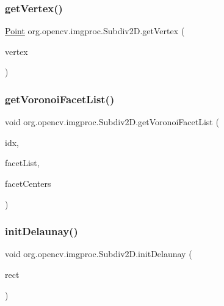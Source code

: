 \subsubsection{\texorpdfstring{get\+Vertex()}{getVertex()}\hspace{0.1cm}{\footnotesize\ttfamily [2/2]}}
{\footnotesize\ttfamily \mbox{\hyperlink{classorg_1_1opencv_1_1core_1_1_point}{Point}} org.\+opencv.\+imgproc.\+Subdiv2\+D.\+get\+Vertex (\begin{DoxyParamCaption}\item[{int}]{vertex }\end{DoxyParamCaption})}

\mbox{\label{classorg_1_1opencv_1_1imgproc_1_1_subdiv2_d_a48829316fa03d30c1dcd95f5dddf25d7}} 
\subsubsection{\texorpdfstring{get\+Voronoi\+Facet\+List()}{getVoronoiFacetList()}}
{\footnotesize\ttfamily void org.\+opencv.\+imgproc.\+Subdiv2\+D.\+get\+Voronoi\+Facet\+List (\begin{DoxyParamCaption}\item[{\mbox{\hyperlink{classorg_1_1opencv_1_1core_1_1_mat_of_int}{Mat\+Of\+Int}}}]{idx,  }\item[{List$<$ \mbox{\hyperlink{classorg_1_1opencv_1_1core_1_1_mat_of_point2f}{Mat\+Of\+Point2f}} $>$}]{facet\+List,  }\item[{\mbox{\hyperlink{classorg_1_1opencv_1_1core_1_1_mat_of_point2f}{Mat\+Of\+Point2f}}}]{facet\+Centers }\end{DoxyParamCaption})}

\mbox{\label{classorg_1_1opencv_1_1imgproc_1_1_subdiv2_d_a8f12a6f7f41d7efd750f0bfc9a574d90}} 
\subsubsection{\texorpdfstring{init\+Delaunay()}{initDelaunay()}}
{\footnotesize\ttfamily void org.\+opencv.\+imgproc.\+Subdiv2\+D.\+init\+Delaunay (\begin{DoxyParamCaption}\item[{\mbox{\hyperlink{classorg_1_1opencv_1_1core_1_1_rect}{Rect}}}]{rect }\end{DoxyParamCaption})}

